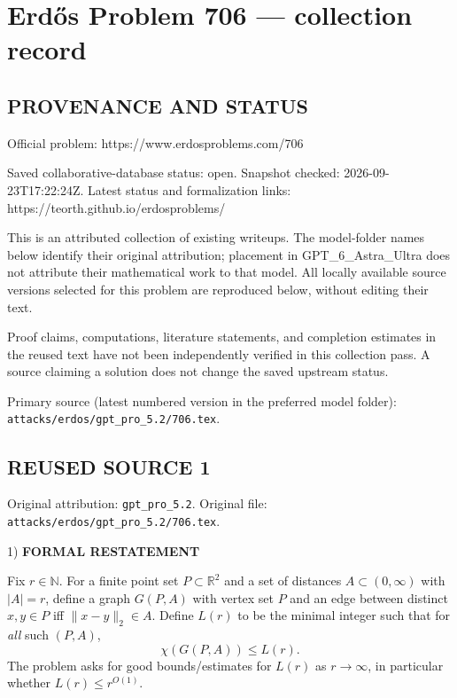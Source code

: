 \section*{Erd\H{o}s Problem 706 --- collection record}

\subsection*{PROVENANCE AND STATUS}
Official problem: https://www.erdosproblems.com/706

Saved collaborative-database status: open.
Snapshot checked: 2026-09-23T17:22:24Z.
Latest status and formalization links: https://teorth.github.io/erdosproblems/

This is an attributed collection of existing writeups. The model-folder names below identify their original attribution; placement in GPT\_6\_Astra\_Ultra does not attribute their mathematical work to that model. All locally available source versions selected for this problem are reproduced below, without editing their text.

Proof claims, computations, literature statements, and completion estimates in the reused text have not been independently verified in this collection pass. A source claiming a solution does not change the saved upstream status.

Primary source (latest numbered version in the preferred model folder): \texttt{attacks/erdos/gpt\_pro\_5.2/706.tex}.

\subsection*{REUSED SOURCE 1}
Original attribution: \texttt{gpt\_pro\_5.2}.
Original file: \texttt{attacks/erdos/gpt\_pro\_5.2/706.tex}.


1) \textbf{FORMAL RESTATEMENT}

Fix $r\in\mathbb{N}$.
For a finite point set $P\subset\mathbb{R}^2$ and a set of distances $A\subset(0,\infty)$ with $|A|=r$, define a graph $G(P,A)$ with vertex set $P$ and an edge between distinct $x,y\in P$ iff $\|x-y\|_2\in A$.
Define $L(r)$ to be the minimal integer such that for \emph{all} such $(P,A)$,
\[
\chi(G(P,A))\le L(r).
\]
The problem asks for good bounds/estimates for $L(r)$ as $r\to\infty$, in particular whether $L(r)\le r^{O(1)}$.

